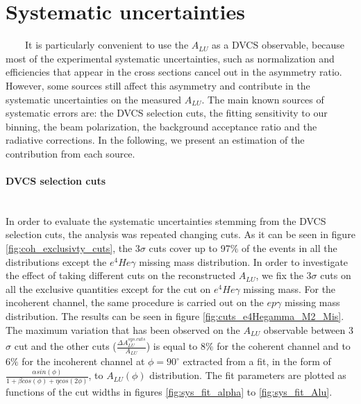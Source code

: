 \section{Systematic uncertainties}

~~~~It is particularly convenient to use the $A_{LU}$ as a DVCS observable, 
because most of the experimental systematic uncertainties, such as 
normalization and efficiencies that appear in the cross sections cancel out in 
the asymmetry ratio. However, some sources still affect this asymmetry and 
contribute in the systematic uncertainties on the measured $A_{LU}$. The main 
known sources of systematic errors are: the DVCS selection cuts, the fitting 
sensitivity to our binning, the beam polarization, the background acceptance 
ratio and the radiative corrections. In the following, we present an estimation 
of the contribution from each source.  

 

\paragraph{DVCS selection cuts}
~\\

In order to evaluate the systematic uncertainties stemming from the DVCS 
selection cuts, the analysis was repeated changing cuts. As it can be seen in 
figure \ref{fig:coh_exclusivty_cuts}, the 3$\sigma$ cuts cover up to 97$\%$ of 
the events in all the distributions except the $e^{4}He\gamma$ missing mass 
distribution. In order to investigate the effect of taking different cuts on 
the reconstructed $A_{LU}$, we fix the 3$\sigma$ cuts on all the exclusive 
quantities except for the cut on $e^{4}He\gamma$ missing mass. For the 
incoherent channel, the same procedure is carried out on the $ep\gamma$ missing 
mass distribution. The results can be seen in figure 
\ref{fig:cuts_e4Hegamma_M2_Mis}. The maximum variation that has been observed 
on the $A_{LU}$ observable between 3$\sigma$ cut and the other cuts 
($\frac{\Delta A^{sys. cuts}_{LU}}{A_{LU}}$) is equal to  8$\%$ for the 
coherent channel and to 6$\%$ for the incoherent channel at $\phi = 90^{\circ}$ 
extracted from a fit, in the form of $\frac{\alpha sin(\phi)}{1+\beta cos(\phi) 
+ \eta cos(2\phi)}$, to $A_{LU}(\phi)$ distribution. The fit parameters are 
plotted as functions of the cut widths in figures \ref{fig:sys_fit_alpha} to 
\ref{fig:sys_fit_Alu}.

